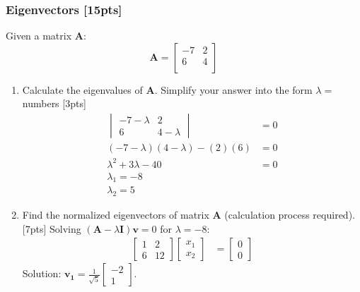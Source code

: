 \documentclass{article}
\begin{document}
\subsubsection{Eigenvectors [15pts]}
Given a matrix $\boldsymbol{A}$:
$$\boldsymbol{A} = \begin{bmatrix} 
    -7 & 2  \\ 
    6 & 4 \\
\end{bmatrix}$$
\begin{enumerate}[label=(\alph*)]
    \item Calculate the eigenvalues of $\boldsymbol{A}$. Simplify your answer into the form $\lambda = $ numbers [3pts]
    \begin{align*}
        \begin{vmatrix} -7 - \lambda & 2 \\ 6 & 4 - \lambda \end{vmatrix} &= 0 \\
        (-7-\lambda)(4-\lambda) - (2)(6) &= 0 \\
        \lambda^2 + 3\lambda - 40 &= 0 \\
        \lambda_1 = -8 \\
        \lambda_2 = 5
    \end{align*}
    \item Find the normalized eigenvectors of matrix $\boldsymbol{A}$ (calculation process required). [7pts]
    Solving $(\boldsymbol{A} - \lambda \boldsymbol{I}) \boldsymbol{v} = 0$ for $\lambda = -8$:
    \begin{align*}
        \begin{bmatrix} 1 & 2 \\ 6 & 12 \end{bmatrix} \begin{bmatrix} x_1 \\ x_2 \end{bmatrix} &= \begin{bmatrix} 0 \\ 0 \end{bmatrix}
    \end{align*}
    Solution: $\mathbf{v_1} = \frac{1}{\sqrt{5}} \begin{bmatrix} -2 \\ 1 \end{bmatrix}$.
    

\end{enumerate}
\end{document}
